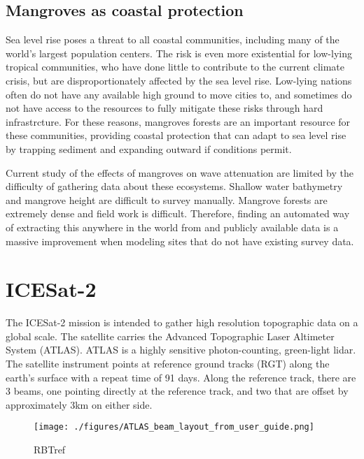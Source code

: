 \hypertarget{mangroves-as-coastal-protection}{%
  \subsection{Mangroves as coastal
    protection}\label{mangroves-as-coastal-protection}}

Sea level rise poses a threat to all coastal communities, including many
of the world's largest population centers. The risk is even more
existential for low-lying tropical communities, who have done little to
contribute to the current climate crisis, but are disproportionately
affected by the sea level rise. Low-lying nations often do not have any
available high ground to move cities to, and sometimes do not have
access to the resources to fully mitigate these risks through hard
infrastrcture. For these reasons, mangroves forests are an important
resource for these communities, providing coastal protection that can
adapt to sea level rise by trapping sediment and expanding outward if
conditions permit.

Current study of the effects of mangroves on wave attenuation are
limited by the difficulty of gathering data about these ecosystems.
Shallow water bathymetry and mangrove height are difficult to survey
manually. Mangrove forests are extremely dense and field work is
difficult. Therefore, finding an automated way of extracting this
anywhere in the world from and publicly available data is a massive
improvement when modeling sites that do not have existing survey data.

\hypertarget{icesat-2}{%
  \section{ICESat-2}\label{icesat-2}}

The ICESat-2 mission is intended to gather high resolution topographic
data on a global scale. The satellite carries the Advanced Topographic
Laser Altimeter System (ATLAS). ATLAS is a highly sensitive
photon-counting, green-light lidar. The satellite instrument points at
reference ground tracks (RGT) along the earth's surface with a repeat
time of 91 days. Along the reference track, there are 3 beams, one
pointing directly at the reference track, and two that are offset by
approximately 3km on either side.

\begin{figure}
  \centering
  \texttt{[image: ./figures/ATLAS\_beam\_layout\_from\_user\_guide.png]}
  \caption{RBTref}
\end{figure}

